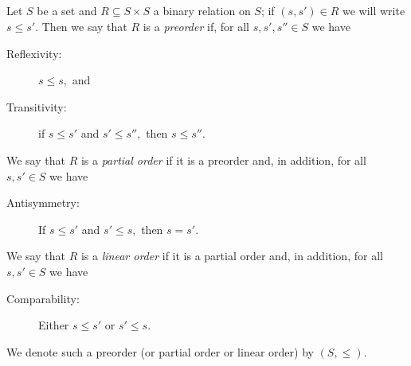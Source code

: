 \documentclass[../main/CT4S-EN-RU]{subfiles}
\begin{document}

\subsection{}

\begin{definitionENG}\label{def:orders}
Let $S$ be a set and $R\subseteq S\times S$ a binary relation on $S$; if $(s,s')\in R$ we will write $s\leq s'.$ Then we say that $R$ is a {\em preorder} if, for all $s,s',s''\in S$ we have
\begin{description}
\item[Reflexivity:] $s\leq s,$ and
\item[Transitivity:] if $s\leq s'$ and $s'\leq s'',$ then $s\leq s''.$
\end{description}
We say that $R$ is a {\em partial order} if it is a preorder and, in addition, for all $s,s'\in S$ we have
\begin{description}
\item[Antisymmetry:] If $s\leq s'$ and $s'\leq s,$ then $s=s'.$
\end{description}
We say that $R$ is a {\em linear order} if it is a partial order and, in addition, for all $s,s'\in S$ we have
\begin{description}
\item[Comparability:] Either $s\leq s'$ or $s'\leq s.$
\end{description}
We denote such a preorder (or partial order or linear order) by $(S,\leq).$
\end{definitionENG}
\end{document}
